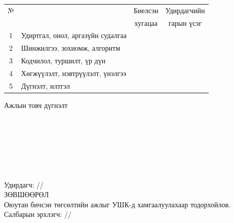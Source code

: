 \begin{titlepage}
\begin{center}
\begin{tabular}{|c|p{7cm}|c|c|}
	\hline
	№ & \makebox[7cm][c]{Хийж гүйцэтгэсэн ажил} & Биелсэн     & Удирдагчийн \\
	  &                    & хугацаа    & гарын үсэг \\ \hline
	1 & {Удиртгал, онол, аргазүйн судалгаа} & &  \\ \hline
	2 & {Шинжилгээ, зохиомж, алгоритм}      & &  \\ \hline
	3 & {Кодчилол, туршилт, үр дүн}         & &  \\ \hline
	4 & {Хөгжүүлэлт, нэвтрүүлэлт, үнэлгээ}  & &  \\ \hline
	5 & {Дүгнэлт, илтгэл}                  & &  \\ \hline
\end{tabular}

\vspace{1cm}
Ажлын товч дүгнэлт \\[0.5cm]
\dotfill \\[0.2cm]
\dotfill \\[0.2cm]
\dotfill \\[0.2cm]
\dotfill \\[0.2cm]
\dotfill \\[0.2cm]
\dotfill \\[0.2cm]
\dotfill \\[0.5cm]
Удирдагч: \makebox[3cm]{\dotfill} /\supname/ \\

\vspace{2cm}
ЗӨВШӨӨРӨЛ \\[0.5cm]
Оюутан  бичсэн төгсөлтийн ажлыг УШК-д хамгаалуулахаар тодорхойлов.\\[0.5cm]
Салбарын эрхлэгч: \makebox[3cm]{\dotfill} /\chairname/
\end{center}

\end{titlepage}

\newpage

